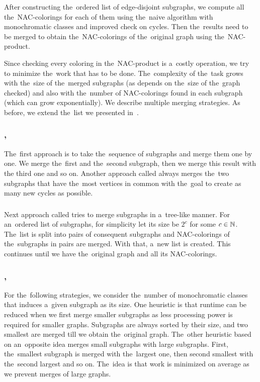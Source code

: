 After constructing the~ordered list of edge-disjoint subgraphs,
we compute all the~NAC-colorings for each of them using
the~naive algorithm with monochromatic classes
and improved check on cycles.
Then the~results need to be merged to obtain the~NAC-colorings of the~original graph
using the~NAC-product.

Since checking every coloring in the~NAC-product is a~costly operation,
we try to minimize the~work that has to be done.
The~complexity of the~task grows with the~size of
the~merged subgraphs (as \IsNACColoring{} depends on the~size of the~graph checked)
and also with the~number of NAC-colorings found in each subgraph
(which can grow exponentially).
We describe multiple merging strategies.
As before, we extend the~list we presented in~\cite{my_paper}.

\subsubsection*{\MergeLinear{}, \SharedVertices{}}

The~first approach \MergeLinear{} is
to take the~sequence of subgraphs and merge them one by one.
We merge the~first and the~second subgraph, then we merge this result with the
third one and so on.
%
Another approach called \SharedVertices{} always merges the~two subgraphs that
have the~most vertices in common with the~goal
to create as many new cycles as possible.

\subsubsection*{\Log{}}

Next approach called \Log{} tries to merge subgraphs in a~tree-like manner.
For an~ordered list of subgraphs,
for simplicity let its size be \( 2^c \) for some \( c \in \mathbb{N} \).
The~list is split into pairs of consequent subgraphs and NAC-colorings
of the~subgraphs in pairs are merged. With that, a~new list is created.
This continues until we have the~original graph and all its NAC-colorings.

\subsubsection*{\SortedBits{}, \MinMax{}}

For the~following strategies,
we consider the~number of monochromatic classes
that induces a~given subgraph as its size.
%
One heuristic \SortedBits{} is that runtime can be reduced
when we first merge smaller subgraphs as less processing power is
required for smaller graphs.
Subgraphs are always sorted by their size, and two smallest are merged
till we obtain the~original graph.
%
The~other heuristic \MinMax{} based on an~opposite idea
merges small subgraphs with large subgraphs.
First, the~smallest subgraph is merged with the~largest one,
then second smallest with the~second largest and so on.
The~idea is that work is minimized on average
as we prevent merges of large graphs.

